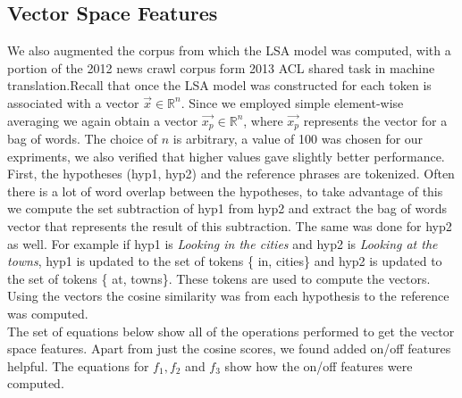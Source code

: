 \documentclass[11pt]{article}
\begin{document}
\subsection{Vector Space Features}
 We also augmented the corpus from which the LSA model was computed,
with a portion of the 2012 news crawl corpus form 2013 ACL shared task in
machine translation.Recall that once the LSA model was constructed for each 
token is associated with a vector $\vec{x}\in \mathbb{R}^n$.
Since we employed simple element-wise averaging we again obtain a vector
$\vec{x_p} \in \mathbb{R}^n$, where $\vec{x_p}$ represents the vector for a bag
of words. The choice of $n$ is arbitrary, a value of 100 was chosen for
our expriments, we also verified that higher values gave slightly better
performance.\\
First, the hypotheses (hyp1, hyp2) and the reference phrases are
tokenized. Often there is a lot of word overlap between the hypotheses, to take
advantage of this we compute the set subtraction of hyp1 from hyp2 and extract
the bag of words vector that represents the result of this subtraction. The same
was done for hyp2 as well. For example if hyp1 is \emph{Looking in the cities}
and hyp2 is \emph{Looking at the towns}, hyp1 is updated to the set of tokens \{
in, cities\} and hyp2 is updated to the set of tokens \{ at, towns\}. These
tokens are used to compute the vectors. Using the vectors the cosine similarity
was from each hypothesis to the reference was computed.\\
 The set of equations
below show all of the operations performed to get the vector space features.
Apart from just the cosine scores, we found added on/off features helpful. The
equations for $f_1, f_2$ and $f_3$ show how the on/off features were computed.
\end{document}
